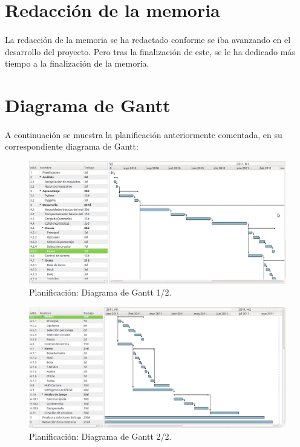 \section{Redacción de la memoria}

\paragraph{}
La redacción de la memoria se ha redactado conforme se iba avanzando en el desarrollo del proyecto. Pero tras la finalización
de este, se le ha dedicado más tiempo a la finalización de la memoria.

\section{Diagrama de Gantt}

\paragraph{}
A continuación se muestra la planificación anteriormente comentada, en su correspondiente diagrama de Gantt:

\begin{figure}[H]
  \label{gant1}
  \begin{center}
    \includegraphics[scale=0.51, angle=90]{imagenes/planificacion/gant1.png}
  \end{center}
  \caption{Planificación: Diagrama de Gantt 1/2.}
\end{figure}

\begin{figure}[H]
  \label{gant2}
  \begin{center}
    \includegraphics[scale=0.51, angle=90]{imagenes/planificacion/gant2.png}
  \end{center}
  \caption{Planificación: Diagrama de Gantt 2/2.}
\end{figure}

